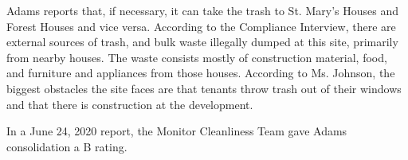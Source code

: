 Adams reports that, if necessary, it can take the trash to St. Mary's Houses and Forest Houses and vice versa. According to the Compliance Interview, there are external sources of trash, and bulk waste illegally dumped at this site, primarily from nearby houses. The waste consists mostly of construction material, food, and furniture and appliances from those houses. According to Ms. Johnson, the biggest obstacles the site faces are that tenants throw trash out of their windows and that there is construction at the development.



In a June 24, 2020 report, the Monitor Cleanliness Team gave Adams consolidation a B rating.